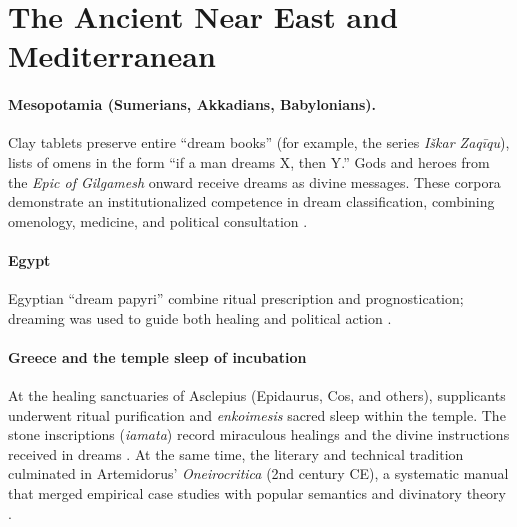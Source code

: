 \section{The Ancient Near East and Mediterranean}\label{sec:mediterranean_and_middle_east}

\paragraph{Mesopotamia (Sumerians, Akkadians, Babylonians).}
Clay tablets preserve entire “dream books” (for example, the series \textit{Iškar Zaqīqu}), lists of omens in the form “if a man dreams X, then Y.”  
Gods and heroes \- from the \textit{Epic of Gilgamesh} onward \- receive dreams as divine messages.  
These corpora demonstrate an institutionalized competence in dream classification, combining omenology, medicine, and political consultation \citep{oppenheim1956dreams}.

\paragraph{Egypt}
Egyptian “dream papyri” combine ritual prescription and prognostication; dreaming was used to guide both healing and political action \citep{oppenheim1956dreams}.  

\paragraph{Greece and the temple sleep of incubation}
At the healing sanctuaries of Asclepius (Epidaurus, Cos, and others), supplicants underwent ritual purification and \textit{enkoimesis} \- sacred sleep within the temple.  
The stone inscriptions (\textit{iamata}) record miraculous healings and the divine instructions received in dreams \citep{lidonnici1995epidaurus,edelstein1957asclepius}.  
At the same time, the literary and technical tradition culminated in Artemidorus’ \textit{Oneirocritica} (2nd century CE), a systematic manual that merged empirical case studies with popular semantics and divinatory theory \citep{harrismccoy2012artemidorus}.
